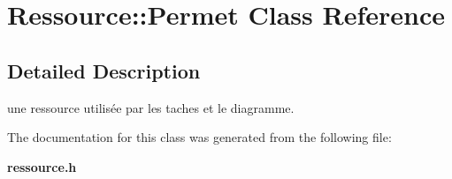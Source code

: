 \section{Ressource\-:\-:Permet Class Reference}
\label{class_ressource_1_1_permet}


\subsection{Detailed Description}
une ressource utilisée par les taches et le diagramme. 

The documentation for this class was generated from the following file\-:\begin{DoxyCompactItemize}
\item 
{\bf ressource.\-h}\end{DoxyCompactItemize}
